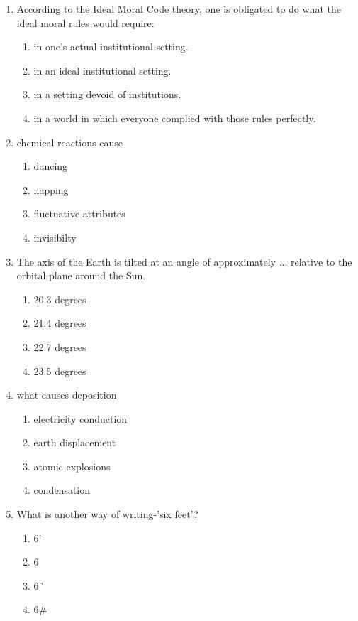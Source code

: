 \documentclass[12pt]{article}
\begin{document}
\begin{enumerate}[label=\arabic*.]
\begin{enumerate}[label=(\alph*)]
    \item bass
    \item minnows
    \item aquatic plants
    \item fish-eating birds
\end{enumerate}
\item According to the Ideal Moral Code theory, one is obligated to do what the ideal moral rules would require:
\begin{enumerate}[label=(\alph*)]
    \item in one's actual institutional setting.
    \item in an ideal institutional setting.
    \item in a setting devoid of institutions.
    \item in a world in which everyone complied with those rules perfectly.
\end{enumerate}
\item chemical reactions cause
\begin{enumerate}[label=(\alph*)]
    \item dancing
    \item napping
    \item fluctuative attributes
    \item invisibilty
\end{enumerate}
\item The axis of the Earth is tilted at an angle of approximately ... relative to the orbital plane around the Sun.
\begin{enumerate}[label=(\alph*)]
    \item 20.3 degrees
    \item 21.4 degrees
    \item 22.7 degrees
    \item 23.5 degrees
\end{enumerate}
\item what causes deposition
\begin{enumerate}[label=(\alph*)]
    \item electricity conduction
    \item earth displacement
    \item atomic explosions
    \item condensation
\end{enumerate}
\item What is another way of writing-'six feet'?
\begin{enumerate}[label=(\alph*)]
    \item 6'
    \item 6
    \item 6''
    \item 6\#
\end{enumerate}
\end{enumerate}
\end{document}
